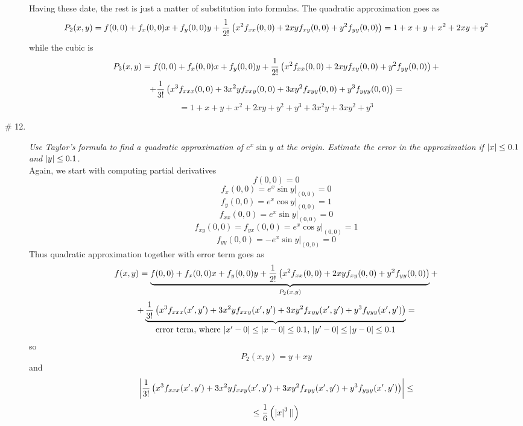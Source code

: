 \documentclass[8pt]{article} %
\begin{document}
\begin{description}
{		Having these date, the rest is just a matter of substitution into formulas. The quadratic approximation goes as
		\[P_2(x,y)=f(0,0)+f_x(0,0)x+f_y(0,0)y+\frac{1}{2!}\left(x^2f_{xx}(0,0)+2xyf_{xy}(0,0)+y^2f_{yy}(0,0)\right)=1+x+y+x^2+2xy+y^2\]
		while the cubic is
		\[P_3(x,y)=f(0,0)+f_x(0,0)x+f_y(0,0)y+\frac{1}{2!}\left(x^2f_{xx}(0,0)+2xyf_{xy}(0,0)+y^2f_{yy}(0,0)\right)+\]\[+
		\frac{1}{3!}\left(x^3f_{xxx}(0,0)+3x^2yf_{xxy}(0,0)+3xy^2f_{xyy}(0,0)+y^3f_{yyy}(0,0)\right)=\]
		\[=1+x+y+x^2+2xy+y^2+y^3+3x^2y+3xy^2+y^3\]
		}
	\item[\# 12.]{{\it Use Taylor's formula to find a quadratic approximation of $e^x\sin y$ at the origin. Estimate the error in the 
		approximation if $\left|x\right|\leq 0.1$ and $\left|y\right|\leq 0.1$.}\\
		Again, we start with computing partial derivatives
		\[f(0,0)=0\]
		\[f_x(0,0)=e^x\sin y\bigg|_{(0,0)}=0\]
		\[f_y(0,0)=e^x\cos y\bigg|_{(0,0)}=1\]
		\[f_{xx}(0,0)=e^x\sin y\bigg|_{(0,0)}=0\]
		\[f_{xy}(0,0)=f_{yx}(0,0)=e^x\cos y\bigg|_{(0,0)}=1\]
		\[f_{yy}(0,0)=-e^x\sin y\bigg|_{(0,0)}=0\]
		}
		Thus quadratic approximation together with error term goes as
		\[f(x,y)=\underbrace{f(0,0)+f_x(0,0)x+f_y(0,0)y+\frac{1}{2!}\left(x^2f_{xx}(0,0)+2xyf_{xy}(0,0)+y^2f_{yy}(0,0)\right)}_{P_2(x,y)}+\]
		\[+\underbrace{\frac{1}{3!}\left(x^3f_{xxx}(x',y')+3x^2yf_{xxy}(x',y')+3xy^2f_{xyy}(x',y')+y^3f_{yyy}(x',y')\right)
		}_{\mbox{error term, where $\left|x'-0\right|\leq\left|x-0\right|\leq 0.1$, $\left|y'-0\right|\leq\left|y-0\right|\leq 0.1$}}=\]
		so \[P_2(x,y)=y+xy\]
		and \[\left|\frac{1}{3!}\left(x^3f_{xxx}(x',y')+3x^2yf_{xxy}(x',y')+3xy^2f_{xyy}(x',y')+y^3f_{yyy}(x',y')\right)\right|\leq\]
		\[\leq \frac{1}{6}\left(\left|x\right|^3\left|\right|\right)\]
\end{description}
\end{document}
